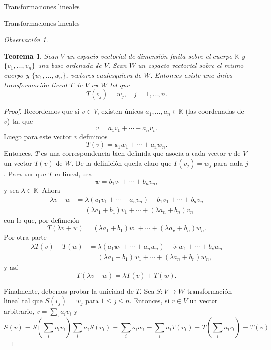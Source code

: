 \documentclass[a4paper,12pt,twoside,spanish]{amsbook}
\newtheorem{teorema}{Teorema}[section]
\theoremstyle{definition}
\theoremstyle{remark}
\newtheorem{obs}{Observaci\'on}[section]
\newcommand{\K}{\mathbb K}
\begin{document}
\begin{chapter}{Transformaciones lineales}
\begin{section}{Transformaciones lineales}
\begin{obs}
		\end{obs}
		
		
		\begin{teorema}\label{th-tl-definida-en-base}
			Sean $V$ un espacio vectorial de dimensión finita sobre el cuerpo $\K$ y $\{v_1,\ldots,v_n\}$  una base ordenada de $V$. Sean $W$ un espacio vectorial sobre el mismo cuerpo y $\{w_1,\ldots,w_n\}$, vectores cualesquiera de $W$. Entonces existe una única transformación  lineal $T$ de $V$ en $W$ tal que
			\begin{equation*}
			T(v_j) = w_j, \quad j=1,\ldots,n.
			\end{equation*}
		\end{teorema}
			\begin{proof}
				Recordemos que si $v \in V$,  existen únicos $a_1,\ldots,a_n \in \K$ (las coordenadas de $v$) tal que $$v = a_1v_1 + \cdots+a_n v_n.$$  Luego para este vector $v$  definimos
				\begin{equation*}
					T(v) = a_1w_1 + \cdots+a_n w_n.
				\end{equation*}
				Entonces, $T$ es una correspondencia bien definida que asocia a cada vector $v$ 
				de $V$ un vector $T(v)$ de $W$. De la definición queda claro que $T(v_j) = w_j$ para cada $j$. Para ver que $T$ es lineal, sea
				\begin{equation*}
					w = b_1v_1 + \cdots+b_n v_n,
				\end{equation*}
				y sea  $\lambda \in \K$. Ahora
				\begin{align*}
					\lambda v+w &= \lambda(a_1v_1 + \cdots+a_n v_n) + b_1v_1 + \cdots+b_n v_n \\
					&= (\lambda a_1+b_1)v_1 + \cdots+(\lambda a_n+b_n)v_n
				\end{align*}
				con lo que, por definición
				\begin{equation*}
					T(\lambda v+w) =(\lambda a_1+b_1)w_1 + \cdots+(\lambda a_n+b_n)w_n. 
				\end{equation*}
				Por otra parte
				\begin{align*}
				\lambda  T(v) + T(w) &= \lambda (a_1w_1 + \cdots+a_n w_n)+b_1w_1 + \cdots+b_n w_n	 \\
				 &=(\lambda a_1+b_1)w_1 + \cdots+(\lambda a_n+b_n)w_n ,			
				\end{align*}
				y así
				\begin{equation*}
					T(\lambda v+w) = 	\lambda  T(v) + T(w).
				\end{equation*}
				
				Finalmente,  debemos probar la unicidad de $T$. Sea $S: V \to W$ transformación lineal tal que $S(v_j) = w_j$ para $1 \le j \le n$. Entonces,  si $v \in V$ un vector arbitrario, $v = \sum_i a_i v_i$ y
				\begin{equation*}
					S(v) = S(\sum_i a_i v_i)\sum_i a_i S( v_i) = \sum_i a_iw_i = 
					 \sum_i a_i T( v_i) =  T(\sum_i a_i v_i) = T(v)
				\end{equation*}
			\end{proof}
		

\end{section}
\end{chapter}
\end{document}
